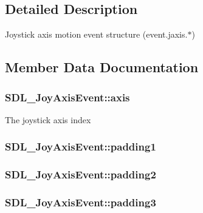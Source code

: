 \subsection{Detailed Description}
Joystick axis motion event structure (event.\-jaxis.$\ast$) 

\subsection{Member Data Documentation}
\hypertarget{struct_s_d_l___joy_axis_event_a0beac2fb161e45771c424bd0b6daeabb}{
\subsubsection[{axis}]{ S\-D\-L\-\_\-\-Joy\-Axis\-Event\-::axis}}\label{struct_s_d_l___joy_axis_event_a0beac2fb161e45771c424bd0b6daeabb}
The joystick axis index \hypertarget{struct_s_d_l___joy_axis_event_ae8e17bced478530638982f0382a0dafa}{
\subsubsection[{padding1}]{ S\-D\-L\-\_\-\-Joy\-Axis\-Event\-::padding1}}\label{struct_s_d_l___joy_axis_event_ae8e17bced478530638982f0382a0dafa}
\hypertarget{struct_s_d_l___joy_axis_event_ad5407250032f618fde7437ac5f229257}{
\subsubsection[{padding2}]{ S\-D\-L\-\_\-\-Joy\-Axis\-Event\-::padding2}}\label{struct_s_d_l___joy_axis_event_ad5407250032f618fde7437ac5f229257}
\hypertarget{struct_s_d_l___joy_axis_event_a8bf5144fddc19686c2003add1f0e1565}{
\subsubsection[{padding3}]{ S\-D\-L\-\_\-\-Joy\-Axis\-Event\-::padding3}}\label{struct_s_d_l___joy_axis_event_a8bf5144fddc19686c2003add1f0e1565}

